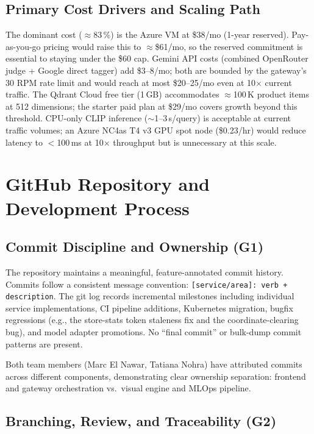 \documentclass[12pt]{article}
\begin{document}
\subsection{Primary Cost Drivers and Scaling Path}

The dominant cost ($\approx$83\,\%) is the Azure VM at \$38/mo (1-year reserved). Pay-as-you-go pricing would raise this to $\approx$\$61/mo, so the reserved commitment is essential to staying under the \$60 cap. Gemini API costs (combined OpenRouter judge + Google direct tagger) add \$3--8/mo; both are bounded by the gateway's 30 RPM rate limit and would reach at most \$20--25/mo even at 10$\times$ current traffic. The Qdrant Cloud free tier (1\,GB) accommodates $\approx$100\,K product items at 512 dimensions; the starter paid plan at \$29/mo covers growth beyond this threshold. CPU-only CLIP inference ($\sim$1--3\,s/query) is acceptable at current traffic volumes; an Azure NC4as T4 v3 GPU spot node (\$0.23/hr) would reduce latency to $<$100\,ms at 10$\times$ throughput but is unnecessary at this scale.

\section{GitHub Repository and Development Process}
\label{sec:github}

\subsection{Commit Discipline and Ownership (G1)}

The repository maintains a meaningful, feature-annotated commit history. Commits follow a consistent message convention: \texttt{[service/area]: verb + description}. The git log records incremental milestones including individual service implementations, CI pipeline additions, Kubernetes migration, bugfix regressions (e.g., the store-stats token staleness fix and the coordinate-clearing bug), and model adapter promotions. No ``final commit'' or bulk-dump commit patterns are present.

Both team members (Marc El Nawar, Tatiana Nohra) have attributed commits across different components, demonstrating clear ownership separation: frontend and gateway orchestration vs.\ visual engine and MLOps pipeline.

\subsection{Branching, Review, and Traceability (G2)}
\end{document}
